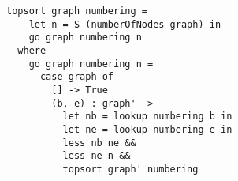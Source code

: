 \begin{figure}[!t]
  \centering
  \begin{minipage}{\columnwidth}
    \begin{lstlisting}[label={topsort_pred}, caption={Functional intepreter for topologic sort of a graph}, captionpos=b, frame=tb]
topsort graph numbering =
    let n = S (numberOfNodes graph) in
    go graph numbering n
  where
    go graph numbering n =
      case graph of
        [] -> True
        (b, e) : graph' ->
          let nb = lookup numbering b in
          let ne = lookup numbering e in
          less nb ne &&
          less ne n &&
          topsort graph' numbering
    \end{lstlisting}
  \end{minipage}
\end{figure}